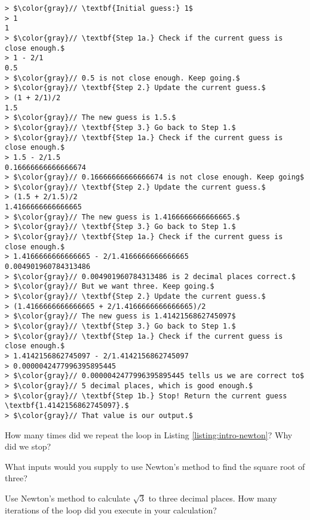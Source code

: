\begin{lstlisting}[caption={\label{listing:intro-newton}Calculating $\sqrt{2}$ to three decimal places using Newton's Method}, escapeinside=$$]
> $\color{gray}// \textbf{Initial guess:} 1$
> 1
1
> $\color{gray}// \textbf{Step 1a.} Check if the current guess is close enough.$
> 1 - 2/1
0.5
> $\color{gray}// 0.5 is not close enough. Keep going.$
> $\color{gray}// \textbf{Step 2.} Update the current guess.$
> (1 + 2/1)/2
1.5
> $\color{gray}// The new guess is 1.5.$
> $\color{gray}// \textbf{Step 3.} Go back to Step 1.$
> $\color{gray}// \textbf{Step 1a.} Check if the current guess is close enough.$
> 1.5 - 2/1.5
0.16666666666666674
> $\color{gray}// 0.16666666666666674 is not close enough. Keep going$
> $\color{gray}// \textbf{Step 2.} Update the current guess.$
> (1.5 + 2/1.5)/2
1.4166666666666665
> $\color{gray}// The new guess is 1.4166666666666665.$
> $\color{gray}// \textbf{Step 3.} Go back to Step 1.$
> $\color{gray}// \textbf{Step 1a.} Check if the current guess is close enough.$
> 1.4166666666666665 - 2/1.4166666666666665
0.004901960784313486
> $\color{gray}// 0.004901960784313486 is 2 decimal places correct.$
> $\color{gray}// But we want three. Keep going.$
> $\color{gray}// \textbf{Step 2.} Update the current guess.$
> (1.4166666666666665 + 2/1.4166666666666665)/2
> $\color{gray}// The new guess is 1.4142156862745097$
> $\color{gray}// \textbf{Step 3.} Go back to Step 1.$
> $\color{gray}// \textbf{Step 1a.} Check if the current guess is close enough.$
> 1.4142156862745097 - 2/1.4142156862745097
> 0.0000042477996395895445
> $\color{gray}// 0.0000042477996395895445 tells us we are correct to$
> $\color{gray}// 5 decimal places, which is good enough.$
> $\color{gray}// \textbf{Step 1b.} Stop! Return the current guess \textbf{1.4142156862745097}.$
> $\color{gray}// That value is our output.$
\end{lstlisting}

\begin{question}
  How many times did we repeat the loop in Listing \ref{listing:intro-newton}? Why did we stop?
\end{question}

\begin{question}
  What inputs would you supply to use Newton's method to find the square root of three?
\end{question}

\begin{question}
  Use Newton's method to calculate $\sqrt{3}$ to three decimal places. How many iterations of the loop did you execute in your calculation?
\end{question}

